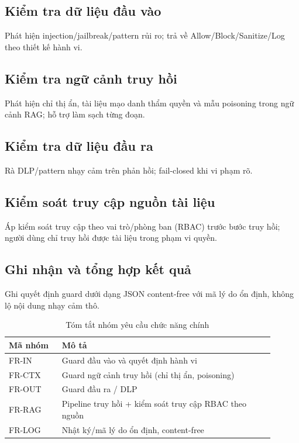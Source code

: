\subsection{Kiểm tra dữ liệu đầu vào}
Phát hiện injection/jailbreak/pattern rủi ro; trả về Allow/Block/Sanitize/Log theo thiết kế hành vi.

\subsection{Kiểm tra ngữ cảnh truy hồi}
Phát hiện chỉ thị ẩn, tài liệu mạo danh thẩm quyền và mẫu poisoning trong ngữ cảnh RAG; hỗ trợ làm sạch từng đoạn.

\subsection{Kiểm tra dữ liệu đầu ra}
Rà DLP/pattern nhạy cảm trên phản hồi; fail-closed khi vi phạm rõ.

\subsection{Kiểm soát truy cập nguồn tài liệu}
Áp kiểm soát truy cập theo vai trò/phòng ban (RBAC) trước bước truy hồi; người dùng chỉ truy hồi được tài liệu trong phạm vi quyền.

\subsection{Ghi nhận và tổng hợp kết quả}
Ghi quyết định guard dưới dạng JSON content-free với mã lý do ổn định, không lộ nội dung nhạy cảm thô.

\begin{table}[H]
\centering
\caption{Tóm tắt nhóm yêu cầu chức năng chính}
\label{tab:fr-summary}
\begin{tabular}{@{}p{0.18\linewidth}p{0.72\linewidth}@{}}
\toprule
\textbf{Mã nhóm} & \textbf{Mô tả} \\
\midrule
FR-IN  & Guard đầu vào và quyết định hành vi \\
FR-CTX & Guard ngữ cảnh truy hồi (chỉ thị ẩn, poisoning) \\
FR-OUT & Guard đầu ra / DLP \\
FR-RAG & Pipeline truy hồi + kiểm soát truy cập RBAC theo nguồn \\
FR-LOG & Nhật ký/mã lý do ổn định, content-free \\
\bottomrule
\end{tabular}
\end{table}

